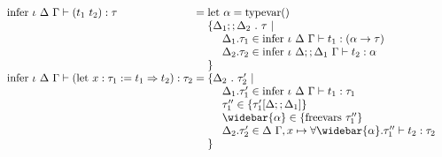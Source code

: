 \documentclass[sigplan,screen]{acmart}
\begin{document}
\begin{figure*}[h]
\[\begin{array}{l @{} l}
      \text{infer } \iota\ \Delta\ \Gamma \vdash 
      (t_1\ t_2) : \tau
      &{} =
      \begin{array}[t]{@{} l}
        \text{let } \alpha = \text{typevar}()
        \\
        \{ \Delta_1;;\Delta_2\ .\ \tau \ |\
        \\
        \ \ \ \ \Delta_1.\tau_1 \in \text{infer } \iota\ \Delta\ \Gamma \vdash t_1 : (\alpha \rightarrow \tau) 
        \\
        \ \ \ \ \Delta_2.\tau_2 \in \text{infer } \iota\ \Delta;;\Delta_1\ \Gamma \vdash t_2 : \alpha
        \\
        \}
      \end{array}
      \\

      \text{infer } \iota\ \Delta\ \Gamma \vdash 
      (\text{let}\ x : \tau_1 := t_1 \Rightarrow t_2) : \tau_2
      &{} =
      \begin{array}[t]{@{} l}
        \{ \Delta_2\ .\ \tau_2' \ |\ 
        \\
        \ \ \ \ \Delta_1.\tau_1' \in \text{infer } \iota\ \Delta\ \Gamma \vdash t_1 : \tau_1
        \\ 
        \ \ \ \ \tau_1'' \in \{\tau_1'[\Delta;;\Delta_1]\}
        \\ 
        \ \ \ \ \widebar{\alpha} \in \{\text{freevars}\ \tau_1''\}
        \\ 
        \ \ \ \ \Delta_2.\tau_2' \in \Delta\ \Gamma,x \mapsto \forall \widebar{\alpha} . \tau_1''
          \vdash t_2 : \tau_2 
        \\
        \} 
      \end{array}
      \\



\end{array}\]
\end{figure*}
\end{document}
